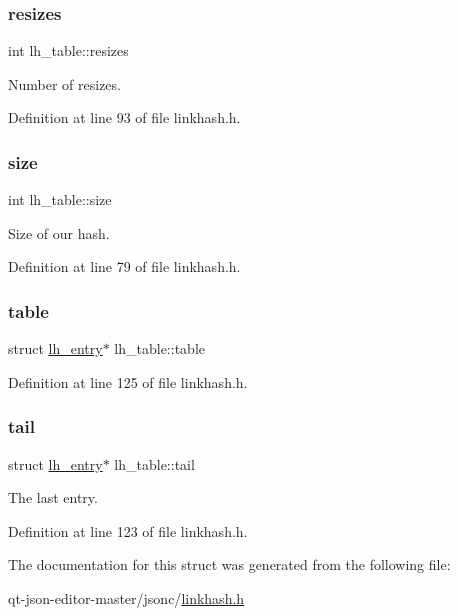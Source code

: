 \subsubsection{\texorpdfstring{resizes}{resizes}}
{\footnotesize\ttfamily int lh\+\_\+table\+::resizes}

Number of resizes. 

Definition at line 93 of file linkhash.\+h.

\mbox{\label{structlh__table_ae251575ec2935bcb0e0589ca8e243839}} 
\subsubsection{\texorpdfstring{size}{size}}
{\footnotesize\ttfamily int lh\+\_\+table\+::size}

Size of our hash. 

Definition at line 79 of file linkhash.\+h.

\mbox{\label{structlh__table_a4fd9c5aba38791b26ab0ec614a5caf8f}} 
\subsubsection{\texorpdfstring{table}{table}}
{\footnotesize\ttfamily struct \hyperlink{structlh__entry}{lh\+\_\+entry}$\ast$ lh\+\_\+table\+::table}



Definition at line 125 of file linkhash.\+h.

\mbox{\label{structlh__table_a479895e45db2bdf9bf5d173fa4b7e277}} 
\subsubsection{\texorpdfstring{tail}{tail}}
{\footnotesize\ttfamily struct \hyperlink{structlh__entry}{lh\+\_\+entry}$\ast$ lh\+\_\+table\+::tail}

The last entry. 

Definition at line 123 of file linkhash.\+h.



The documentation for this struct was generated from the following file\+:\begin{DoxyCompactItemize}
\item 
qt-\/json-\/editor-\/master/jsonc/\hyperlink{linkhash_8h}{linkhash.\+h}\end{DoxyCompactItemize}
